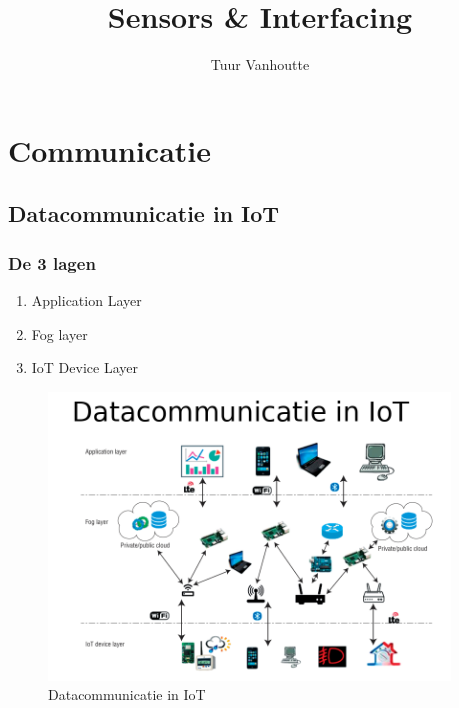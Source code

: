 \documentclass{article}
\begin{document}
\begin{titlepage}
    \author{Tuur Vanhoutte}
    \title{Sensors \& Interfacing}
\end{titlepage}

\maketitle
\newpage
\tableofcontents
\newpage


\section {Communicatie}
\subsection{Datacommunicatie in IoT}
\subsubsection{De 3 lagen}
\begin{enumerate}
    \item Application Layer
    \item Fog layer
    \item IoT Device Layer
\end{enumerate}


\begin{figure}[H]
    \centering
    \includegraphics[width=0.95\textwidth]{Screenshot_20200210_120010.png}
    \caption{Datacommunicatie in IoT}
\end{figure}
\end{document}
